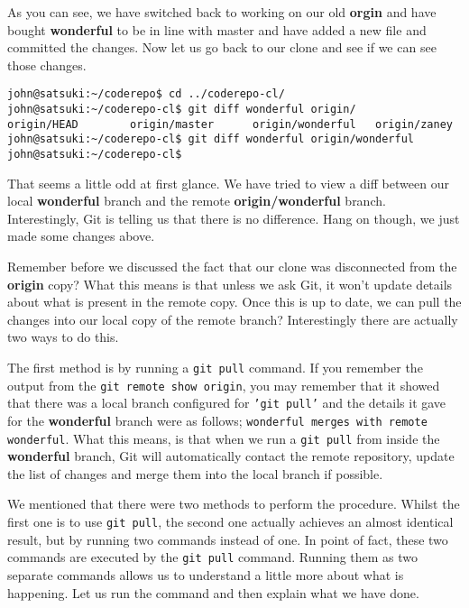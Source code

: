 As you can see, we have switched back to working on our old \textbf{orgin} and have bought \textbf{wonderful} to be in line with master and have added a new file and committed the changes.  Now let us go back to our clone and see if we can see those changes.

\begin{Verbatim}[frame=leftline,framerule=1mm,fontsize=\relsize{-3}] 
john@satsuki:~/coderepo$ cd ../coderepo-cl/
john@satsuki:~/coderepo-cl$ git diff wonderful origin/
origin/HEAD        origin/master      origin/wonderful   origin/zaney 
john@satsuki:~/coderepo-cl$ git diff wonderful origin/wonderful 
john@satsuki:~/coderepo-cl$ 
\end{Verbatim}

That seems a little odd at first glance.  We have tried to view a diff between our local \textbf{wonderful} branch and the remote \textbf{origin/wonderful} branch.  Interestingly, Git is telling us that there is no difference.  Hang on though, we just made some changes above.  

Remember before we discussed the fact that our clone was disconnected from the \textbf{origin} copy?  What this means is that unless we ask Git, it won't update details about what is present in the remote copy.  Once this is up to date, we can pull the changes into our local copy of the remote branch?  Interestingly there are actually two ways to do this.

The first method is by running a \texttt{git pull} command.  If you remember the output from the \texttt{git remote show origin}, you may remember that it showed that there was a local branch configured for \texttt{'git pull'} and the details it gave for the \textbf{wonderful} branch were as follows; \texttt{wonderful merges with remote wonderful}.  What this means, is that when we run a \texttt{git pull} from inside the \textbf{wonderful} branch, Git will automatically contact the remote repository, update the list of changes and merge them into the local branch if possible.

We mentioned that there were two methods to perform the procedure.  Whilst the first one is to use \texttt{git pull}, the second one actually achieves an almost identical result, but by running two commands instead of one.  In point of fact, these two commands are executed by the \texttt{git pull} command.  Running them as two separate commands allows us to understand a little more about what is happening.  Let us run the command and then explain what we have done.

